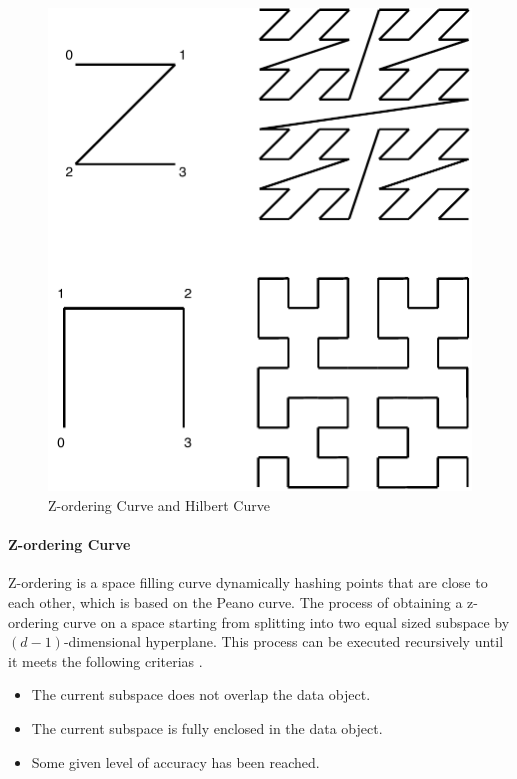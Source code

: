 \begin{figure}[ht]
\centering
\includegraphics[scale=0.5]{Figures/space_curve.pdf}
\caption{Z-ordering Curve and Hilbert Curve}
\label{fig:space_curve}
\end{figure}

\paragraph{Z-ordering Curve}
Z-ordering \cite{Orenstein:1984jq} is a space filling curve dynamically hashing points that are close to each other, which is based on the Peano curve. The process of obtaining a z-ordering curve on a space starting from splitting into two equal sized subspace by ${(d-1)}$-dimensional hyperplane. This process can be executed recursively until it meets the following criterias \cite{Gaede:1998fp}. 

\begin{itemize}
    \item The current subspace does not overlap the data object.
    \item The current subspace is fully enclosed in the data object.
    \item Some given level of accuracy has been reached.
\end{itemize}


